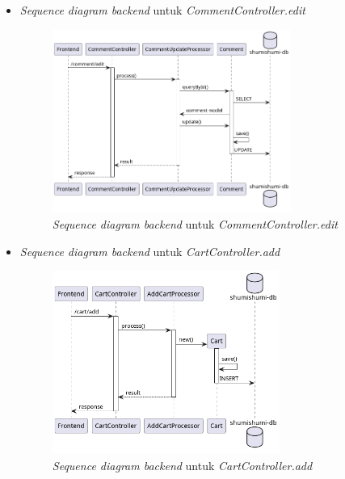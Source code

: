 \documentclass[a4paper]{article}
\begin{document}
\begin{enumerate}
\begin{enumerate}
\begin{itemize}
            \newpage
            \item \textit{Sequence diagram backend} untuk \textit{CommentController.edit}
            \begin{figure}[h]
                \centering
                \includegraphics*[height=6cm]{diagram/sequence diagram/BE/comment controller/edit/edit.png}
                \caption{\textit{Sequence diagram backend} untuk \textit{CommentController.edit}}
            \end{figure}

            \item \textit{Sequence diagram backend} untuk \textit{CartController.add}
            \begin{figure}[h]
                \centering
                \includegraphics*[height=6cm]{diagram/sequence diagram/BE/cart controller/add/add.png}
                \caption{\textit{Sequence diagram backend} untuk \textit{CartController.add}}
            \end{figure}


\end{itemize}
\end{enumerate}
\end{enumerate}
\end{document}
